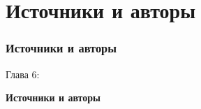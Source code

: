 %

\section{Источники и авторы}
\begin{frame}[fragile]
	\frametitle{Источники и авторы}

	\begin{center}\huge{Глава 6:}\end{center}
	\begin{center}\huge{\color{typo3darkgrey}\textbf{Источники и авторы}}\end{center}

\end{frame}


